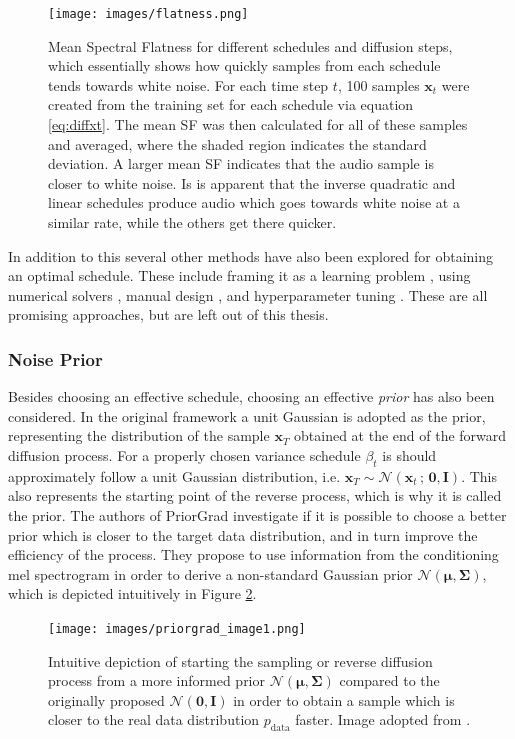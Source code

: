 \documentclass{report}
\begin{document}
\begin{figure}[H]
    \centering
    \texttt{[image: images/flatness.png]}
    \caption{\onehalfspacing Mean Spectral Flatness for different schedules and diffusion steps, which essentially shows how quickly samples from each schedule tends towards white noise. For each time step $t$, 100 samples $\bm{x}_t$ were created from the training set for each schedule via equation \ref{eq:diffxt}. The mean SF was then calculated for all of these samples and averaged, where the shaded region indicates the standard deviation. A larger mean SF indicates that the audio sample is closer to white noise. Is is apparent that the inverse quadratic and linear schedules produce audio which goes towards white noise at a similar rate, while the others get there quicker.}
    \label{fig:flatness}
\end{figure}

In addition to this several other methods have also been explored for obtaining an optimal schedule. These include framing it as a learning problem \cite{watson2021learning, lam2022bddm}, using numerical solvers \cite{jolicoeur2021gotta}, manual design \cite{chen2020wavegrad}, and hyperparameter tuning \cite{chen2022infergrad}. These are all promising approaches, but are left out of this thesis.

\subsubsection{Noise Prior}
Besides choosing an effective schedule, choosing an effective \textit{prior} has also been considered. In the original framework a unit Gaussian is adopted as the prior, representing the distribution of the sample $\textbf{x}_T$ obtained at the end of the forward diffusion process. For a properly chosen variance schedule $\beta_t$ is should approximately follow a unit Gaussian distribution, i.e. $\bm{x}_T \sim \mathcal{N}(\bm{x}_t \, ; \, \bm{0}, \bm{I})$. This also represents the starting point of the reverse process, which is why it is called the prior. The authors of PriorGrad \cite{lee2021priorgrad} investigate if it is possible to choose a better prior which is closer to the target data distribution, and in turn improve the efficiency of the process. They propose to use information from the conditioning mel spectrogram in order to derive a non-standard Gaussian prior $\mathcal{N}(\bm{\mu}, \bm{\Sigma})$, which is depicted intuitively in Figure \ref{fig:priorgrad1}.

\begin{figure}[H]
    \centering
    \texttt{[image: images/priorgrad\_image1.png]}
    \caption{\onehalfspacing Intuitive depiction of starting the sampling or reverse diffusion process from a more informed prior $\mathcal{N}(\bm{\mu}, \bm{\Sigma})$ compared to the originally proposed $\mathcal{N}(\bm{0}, \bm{I})$ in order to obtain a sample which is closer to the real data distribution $p_{\text{data}}$ faster. Image adopted from \cite{lee2021priorgrad}.}
    \label{fig:priorgrad1}
\end{figure}
\end{document}
